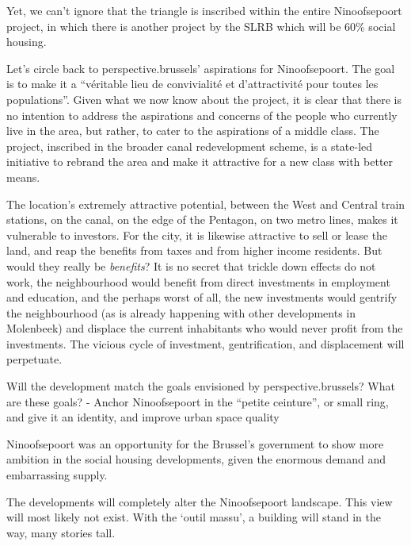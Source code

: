 \documentclass{article}[11pt]
\begin{document}
Yet, we can't ignore that the triangle is inscribed within the entire Ninoofsepoort project, in which there is another project by the SLRB which will be 60\% social housing.

Let's circle back to perspective.brussels' aspirations for Ninoofsepoort. The goal is to make it a ``véritable lieu de convivialité et d’attractivité pour toutes les populations''. Given what we now know about the project, it is clear that there is no intention to address the aspirations and concerns of the people who currently live in the area, but rather, to cater to the aspirations of a middle class.
The project, inscribed in the broader canal redevelopment scheme, is a state-led initiative to rebrand the area and make it attractive for a new class with better means.

The location's extremely attractive potential, between the West and Central train stations, on the canal, on the edge of the Pentagon, on two metro lines, makes it vulnerable to investors. For the city, it is likewise attractive to sell or lease the land, and reap the benefits from taxes and from higher income residents. But would they really be \textit{benefits}? It is no secret that trickle down effects do not work, the neighbourhood would benefit from direct investments in employment and education, and the perhaps worst of all, the new investments would gentrify the neighbourhood (as is already happening with other developments in Molenbeek) and displace the current inhabitants who would never profit from the investments.
The vicious cycle of investment, gentrification, and displacement will perpetuate.

Will the development match the goals envisioned by perspective.brussels?
What are these goals?
	- Anchor Ninoofsepoort in the ``petite ceinture'', or small ring, and give it an identity, and improve urban space quality


Ninoofsepoort was an opportunity for the Brussel's government to show more ambition in the social housing developments, given the enormous demand and embarrassing supply. 

The developments will completely alter the Ninoofsepoort landscape. This view will most likely not exist. With the `outil massu', a building will stand in the way, many stories tall.

\pagebreak

\printbibliography 
\end{document}
